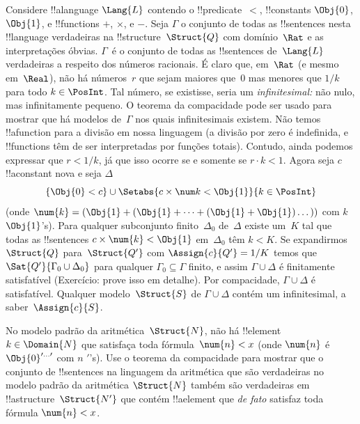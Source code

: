 \documentclass[../../../include/open-logic-section]{subfiles}
\begin{document}
{\begin{ex}
Considere !!a{language} $\Lang{L}$ contendo o !!{predicate}~$<$,
!!{constant}s $\Obj{0}$, $\Obj{1}$, e !!{function}s $+$, $\times$, e
$-$. Seja $\Gamma$ o conjunto de todas as !!{sentence}s nesta
!!{language} verdadeiras na !!{structure}~$\Struct{Q}$ com domínio~$\Rat$ e as
interpretações óbvias.  $\Gamma$~é o conjunto de todas as !!{sentence}s
de~$\Lang{L}$ verdadeiras a respeito dos números racionais. É claro que, em~$\Rat$
(e mesmo em~$\Real$), não há números~$r$ que sejam maiores que~$0$
mas menores que $1/k$ para todo $k \in \PosInt$.  Tal número, se
existisse, seria um \emph{infinitesimal:} não nulo, mas infinitamente
pequeno.  O teorema da compacidade pode ser usado para mostrar que há
modelos de~$\Gamma$ nos quais infinitesimais existem. Não temos
!!a{function} para a divisão em nossa linguagem (a divisão por zero é
indefinida, e !!{function}s têm de ser interpretadas por funções totais).
Contudo, ainda podemos expressar que $r < 1/k$, já que isso ocorre se e somente se
$r \cdot k < 1$. Agora seja $c$ !!a{constant} nova e seja $\Delta$
\[
\{\Obj{0} < c\}
\cup \Setabs{ c \times \num k < \Obj{1} }{k \in \PosInt}
\]
(onde $\num{k} = (\Obj{1} + (\Obj{1} + \dots + (\Obj{1} +
\Obj{1})\dots))$ com $k$~$\Obj{1}$'s). Para qualquer subconjunto
finito~$\Delta_0$ de~$\Delta$ existe um~$K$ tal que todas as
!!{sentence}s $c \times \num{k} < \Obj{1}$ em~$\Delta_0$ têm $k < K$.
Se expandirmos $\Struct{Q}$ para~$\Struct{Q'}$ com $\Assign{c}{Q'} = 1/K$
temos que $\Sat{Q'}{\Gamma_0 \cup \Delta_0}$ para qualquer
$\Gamma_0 \subseteq \Gamma$ finito, e assim $\Gamma \cup \Delta$ é finitamente
satisfatível (Exercício: prove isso em detalhe). Por compacidade, $\Gamma
\cup \Delta$ é satisfatível. Qualquer modelo~$\Struct{S}$ de $\Gamma \cup
\Delta$ contém um infinitesimal, a saber~$\Assign{c}{S}$.
\end{ex}
}{}

\begin{prob}
No modelo padrão da aritmética~$\Struct{N}$, não há
!!{element}~$k \in \Domain{N}$ que satisfaça toda fórmula~$\num{n}
< x$ (onde $\num{n}$ é $\Obj{0}^{\prime\dots\prime}$ com $n$
$\prime$'s).  Use o teorema da compacidade para mostrar que o conjunto de
!!{sentence}s na linguagem da aritmética que são verdadeiras no modelo padrão
da aritmética $\Struct{N}$ também são verdadeiras em
!!a{structure}~$\Struct{N'}$ que contém !!a{element} que
\emph{de fato} satisfaz toda fórmula $\num{n} < x$.
\end{prob}
\tagendprob
\end{document}
